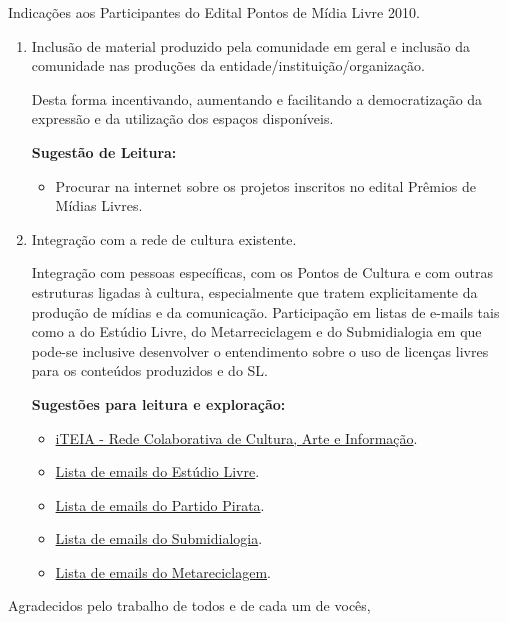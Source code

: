 \documentclass{letter}[20pt]
\begin{document}
\begin{letter}{Indicações aos Participantes do Edital Pontos de Mídia Livre 2010.}
\begin{enumerate}
  \item Inclusão de material produzido pela comunidade em geral e inclusão da comunidade nas produções da entidade/instituição/organização.

    Desta forma incentivando, aumentando e facilitando a democratização da expressão e da utilização dos espaços disponíveis.

  {\bf Sugestão de Leitura:}
  \begin{itemize}
    \renewcommand{\labelitemi}{$\rightarrow$}
    \item Procurar na internet sobre os projetos inscritos no edital Prêmios de Mídias Livres.
  \end{itemize}
  \vfill
  

  \item Integração com a rede de cultura existente.

  Integração com pessoas específicas, com os Pontos de Cultura e com 
  outras estruturas ligadas à cultura, especialmente que tratem 
  explicitamente da produção de mídias e da comunicação. 
  Participação em listas de e-mails tais como a do Estúdio Livre, do 
  Metarreciclagem e do Submidialogia em que pode-se inclusive desenvolver o entendimento sobre o uso de licenças livres para os conteúdos produzidos e do SL.

  {\bf Sugestões para leitura e exploração:}
  \begin{itemize}
    \renewcommand{\labelitemi}{$\rightarrow$}
    \item \href{http://www.iteia.org.br/}{iTEIA  - Rede Colaborativa de Cultura, Arte e Informação}.
    \item \href{https://lists.riseup.net/www/subscribe/estudiolivre/}{Lista de emails do Estúdio Livre}.
    \item \href{http://www.partidopirata.org/listas/}{Lista de emails do Partido Pirata}.
    \item \href{https://lists.riseup.net/www/subscribe/submidialogia/}{Lista de emails do Submidialogia}.
    \item \href{https://lists.riseup.net/www/subscribe/metareciclagem/}{Lista de emails do Metareciclagem}.
  \end{itemize}
  \vspace{1cm}

\end{enumerate}

\vfill
\closing{Agradecidos pelo trabalho de todos e de cada um de vocês,}
\vfill

\end{letter}
\end{document}
